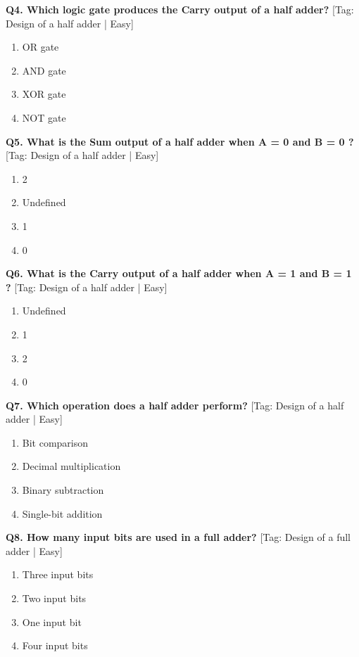 \noindent\textbf{Q4. Which logic gate produces the Carry output of a half adder?} \hfill [Tag: Design of a half adder | Easy]
\begin{enumerate}[label=(\alph*),topsep=2pt,itemsep=1pt,partopsep=0pt,parsep=0pt]
    \item {OR gate}
    \item {AND gate}
    \item {XOR gate}
    \item {NOT gate}
\end{enumerate}
\vspace{2mm}

\noindent\textbf{Q5. What is the Sum output of a half adder when A = 0 and B = 0 ?} \hfill [Tag: Design of a half adder | Easy]
\begin{enumerate}[label=(\alph*),topsep=2pt,itemsep=1pt,partopsep=0pt,parsep=0pt]
    \item {2}
    \item {Undefined}
    \item {1}
    \item {0}
\end{enumerate}
\vspace{2mm}

\noindent\textbf{Q6. What is the Carry output of a half adder when A = 1 and B = 1 ?} \hfill [Tag: Design of a half adder | Easy]
\begin{enumerate}[label=(\alph*),topsep=2pt,itemsep=1pt,partopsep=0pt,parsep=0pt]
    \item {Undefined}
    \item {1}
    \item {2}
    \item {0}
\end{enumerate}
\vspace{2mm}

\noindent\textbf{Q7. Which operation does a half adder perform?} \hfill [Tag: Design of a half adder | Easy]
\begin{enumerate}[label=(\alph*),topsep=2pt,itemsep=1pt,partopsep=0pt,parsep=0pt]
    \item {Bit comparison}
    \item {Decimal multiplication}
    \item {Binary subtraction}
    \item {Single-bit addition}
\end{enumerate}
\vspace{2mm}

\noindent\textbf{Q8. How many input bits are used in a full adder?} \hfill [Tag: Design of a full adder | Easy]
\begin{enumerate}[label=(\alph*),topsep=2pt,itemsep=1pt,partopsep=0pt,parsep=0pt]
    \item {Three input bits}
    \item {Two input bits}
    \item {One input bit}
    \item {Four input bits}
\end{enumerate}
\vspace{2mm}

